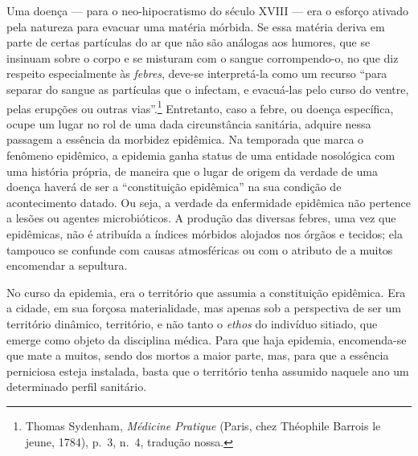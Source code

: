 Uma doença --- para o neo-hipocratismo do século XVIII --- era o esforço
ativado pela natureza para evacuar uma matéria mórbida. Se essa matéria
deriva em parte de certas partículas do ar que não são análogas aos
humores, que se insinuam sobre o corpo e se misturam com o sangue
corrompendo-o, no que diz respeito especialmente às \textit{febres},
deve-se interpretá-la como um recurso ``para separar do sangue as
partículas que o infectam, e evacuá-las pelo curso do ventre, pelas
erupções ou outras vias''.\footnote{Thomas Sydenham, \textit{Médicine
  Pratique} (Paris, chez Théophile Barrois le jeune, 1784), p.~3, n.~4,
  tradução nossa.} Entretanto, caso a febre, ou doença específica, ocupe
um lugar no rol de uma dada circunstância sanitária, adquire nessa
passagem a essência da morbidez epidêmica. Na temporada que marca o
fenômeno epidêmico, a epidemia ganha status de uma entidade nosológica
com uma história própria, de maneira que o lugar de origem da verdade de
uma doença haverá de ser a ``constituição epidêmica'' na sua condição de
acontecimento datado. Ou seja, a verdade da enfermidade epidêmica não
pertence a lesões ou agentes microbióticos. A produção das diversas
febres, uma vez que epidêmicas, não é atribuída a índices mórbidos
alojados nos órgãos e tecidos; ela tampouco se confunde com causas
atmosféricas ou com o atributo de a muitos encomendar a sepultura.

No curso da epidemia, era o território que assumia a constituição
epidêmica. Era a cidade, em sua forçosa materialidade, mas apenas sob a
perspectiva de ser um território dinâmico, território, e não tanto o
\textit{ethos} do indivíduo sitiado, que emerge como objeto da disciplina
médica. Para que haja epidemia, encomenda-se que mate a muitos, sendo
dos mortos a maior parte, mas, para que a essência perniciosa esteja
instalada, basta que o território tenha assumido naquele ano um
determinado perfil sanitário.


